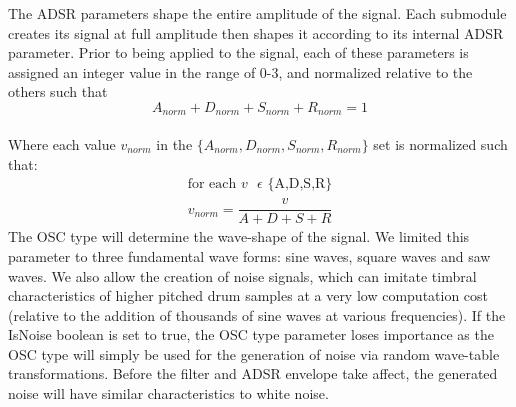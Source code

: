 \documentclass[\main/thesis.tex]{subfiles}
\begin{document}
\begin{table}[t!]
\centering
{}
\caption{Synthesizer submodule Parameters. Despite the simplicity of the parameters and our efforts at constraining the ranges, the number of parameters that can be randomly chosen for each submodule is in the order of $10^{15}$ }
\label{table:submodule_params}
\end{table}
The ADSR parameters shape the entire amplitude of the signal. Each submodule creates its signal at full amplitude then shapes it according to its internal ADSR parameter. Prior to being applied to the signal, each of these parameters is assigned an integer value in the range of 0-3, and normalized relative to the others such that \[ A_{norm} + D_{norm} + S_{norm} + R_{norm} = 1 \] \\ 
Where each value $v_{norm}$ in the $\{A_{norm}, D_{norm},S_{norm},R_{norm}\} $ set is normalized such that:
\begin{align*}
\text{for each $v$ $\epsilon$ \{A,D,S,R\}} \\
v_{norm} = \dfrac{v}{A + D + S + R}
\end{align*}
 The OSC type will determine the wave-shape of the signal. We limited this parameter to three fundamental wave forms: sine waves, square waves and saw waves. We also allow the creation of noise signals, which can imitate timbral characteristics of higher pitched drum samples at a very low computation cost (relative to the addition of thousands of sine waves at various frequencies). If the IsNoise boolean is set to true, the OSC type parameter loses importance as the OSC type will simply be used for the generation of noise via random wave-table transformations. Before the filter and ADSR envelope take affect, the generated noise will have similar characteristics to white noise. 
\end{document}
